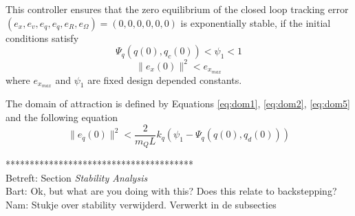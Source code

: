 This controller ensures that the zero equilibrium of the closed loop tracking error $ (e_x,e_v,e_q,e_{\dot{q}},e_R,e_\Omega)=(0,0,0,0,0,0) $ is exponentially stable, if the initial conditions satisfy
\begin{equation}\label{eq:dom5}
\Psi_q(q(0),q_c(0))<\psi_1<1
\end{equation}
\begin{equation}
\parallel e_{x}(0)\parallel^2<e_{x_{max}}
\end{equation}
where $ e_{x_{max}} $ and $ \psi_1 $ are fixed design depended constants. 

The domain of attraction is defined by Equations \ref{eq:dom1}, \ref{eq:dom2}, \ref{eq:dom5} and the following equation
\begin{equation}
\parallel e_{\dot{q}}(0)\parallel^2<\frac{2}{m_QL}{k_q}(\psi_1-\Psi_q(q(0),q_d(0)))
\end{equation}

%
%
%
%
%
%
%
%
%
%
%

***************************************\\
Betreft: Section \textit{Stability Analysis}\\
Bart: Ok, but what are you doing with this? Does this relate to backstepping?\\
Nam: Stukje over stability verwijderd. Verwerkt in de subsecties

